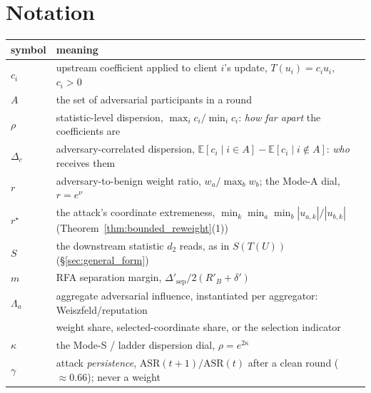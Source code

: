 \documentclass{article}
\begin{document}
\section{Notation}
\label{app:notation}

\begin{center}\small
\begin{tabular}{@{}ll@{}}
\toprule
symbol & meaning \\
\midrule
$c_i$ & upstream coefficient applied to client $i$'s update, $T(u_i) = c_iu_i$, $c_i>0$ \\
$A$ & the set of adversarial participants in a round \\
$\rho$ & statistic-level dispersion, $\max_i c_i/\min_i c_i$: \emph{how far apart} the coefficients are \\
$\Delta_c$ & adversary-correlated dispersion, $\mathbb{E}[c_i \mid i \in A]-\mathbb{E}[c_i \mid i \notin A]$: \emph{who} receives them \\
$r$ & adversary-to-benign weight ratio, $w_a/\max_b w_b$; the Mode-A dial, $r = e^{\nu}$ \\
$r^\star$ & the attack's coordinate extremeness, $\min_k\min_a\min_b |u_{a,k}|/|u_{b,k}|$ (Theorem~\ref{thm:bounded_reweight}(1)) \\
$S$ & the downstream statistic $d_2$ reads, as in $S(T(U))$ (§\ref{sec:general_form}) \\
$m$ & RFA separation margin, $\Delta'_{\mathrm{sep}}/2(R'_B{+}\delta')$ \\
$\Lambda_a$ & aggregate adversarial influence, instantiated per aggregator: Weiszfeld/reputation \\
 & weight share, selected-coordinate share, or the selection indicator \\
$\kappa$ & the Mode-S / ladder dispersion dial, $\rho = e^{2\kappa}$ \\
$\gamma$ & attack \emph{persistence}, $\mathrm{ASR}(t{+}1)/\mathrm{ASR}(t)$ after a clean round ($\approx 0.66$); never a weight \\
\bottomrule
\end{tabular}
\end{center}
\end{document}
